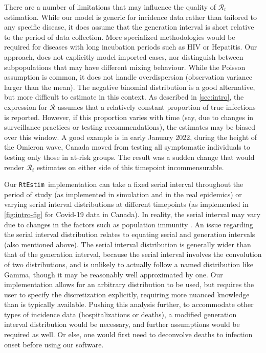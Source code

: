 \documentclass[10pt,letterpaper]{article}
\def\RtEstim{\texttt{RtEstim}}
\def\calR{\mathcal{R}}
\newcommand{\citep}[1]{\cite{#1}}
\begin{document}
There are a number of limitations that may influence the quality of
$\calR_t$ estimation. While our model is generic for incidence data 
rather than tailored to any specific disease, it does assume that the 
generation interval is short relative to the period of data collection. 
More specialized methodologies would be required for diseases with long 
incubation periods such as HIV or Hepatitis. 
Our approach, does not explicitly model imported cases, nor distinguish between
subpopulations that may have different mixing behaviour. 
While the Poisson assumption is common, it does not handle overdispersion
(observation variance larger than the mean). The negative binomial distribution
is a good alternative, but more difficult to estimate in this context.
As described in \autoref{sec:intro}, the expression for $\calR$ 
assumes that a relatively constant proportion of true infections is reported. 
However, if this proportion varies with time (say, due to changes in surveillance
practices or testing recommendations), the estimates may be biased over this
window. A good example is in early January 2022, during the height of the
Omicron wave, Canada moved from testing all symptomatic individuals to
testing only those in at-risk groups. The result was a sudden change that would
render $\calR_t$ estimates on either side of this timepoint incommensurable.


Our \RtEstim\ implementation can take a fixed serial interval throughout the
period of study (as implemented in simulation and in the real epidemics) or 
varying serial interval distributions at different timepoints (as implemented 
in \autoref{fig:intro-fig} for Covid-19 data in Canada). In reality, the serial
interval may vary due to changes in the factors such as population immunity 
\citep{nash2023estimating}. An issue regarding the serial interval distribution 
relates to equating serial and generation intervals (also mentioned above). 
The serial interval distribution is generally wider than that 
of the generation interval, because the serial interval involves the convolution
of two distributions, and is unlikely to actually follow a named distribution
like Gamma, though it may be reasonably well approximated by one. Our
implementation allows for an arbitrary distribution to be used, but requires the
user to specify the discretization explicitly, requiring more nuanced knowledge
than is typically available. Pushing this analysis further, to accommodate other
types of incidence data (hospitalizations or deaths), a modified generation
interval distribution would be necessary, and further assumptions would be
required as well. Or else, one would first need to deconvolve deaths to
infection onset before using our software.
\end{document}
